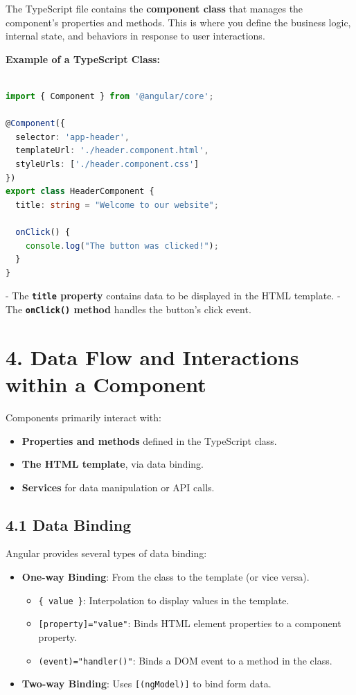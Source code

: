 \documentclass{article}
\begin{document}
The TypeScript file contains the \textbf{component class} that manages the component's properties and methods. This is where you define the business logic, internal state, and behaviors in response to user interactions.

\textbf{Example of a TypeScript Class:}
\begin{lstlisting}[language=TypeScript, caption={Using a service in a component}, label={lst:typescript-service-usage}]

import { Component } from '@angular/core';

@Component({
  selector: 'app-header',
  templateUrl: './header.component.html',
  styleUrls: ['./header.component.css']
})
export class HeaderComponent {
  title: string = "Welcome to our website";

  onClick() {
    console.log("The button was clicked!");
  }
}
\end{lstlisting}
- The \textbf{\texttt{title} property} contains data to be displayed in the HTML template.
- The \textbf{\texttt{onClick()} method} handles the button's click event.
\section*{4. Data Flow and Interactions within a Component}

Components primarily interact with:
\begin{itemize}
  \item \textbf{Properties and methods} defined in the TypeScript class.
  \item \textbf{The HTML template}, via data binding.
  \item \textbf{Services} for data manipulation or API calls.
\end{itemize}

\subsection*{4.1 Data Binding}

Angular provides several types of data binding:
\begin{itemize}
  \item \textbf{One-way Binding}: From the class to the template (or vice versa).
    \begin{itemize}
      \item \texttt{{\{ value \}}}: Interpolation to display values in the template.
      \item \texttt{[property]="value"}: Binds HTML element properties to a component property.
      \item \texttt{(event)="handler()"}: Binds a DOM event to a method in the class.
    \end{itemize}
  \item \textbf{Two-way Binding}: Uses \texttt{[(ngModel)]} to bind form data.
\end{itemize}
\end{document}
